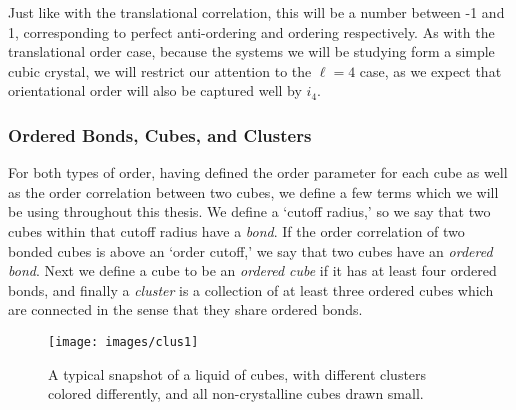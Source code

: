 \documentclass[thesis]{subfiles}
\begin{document}
Just like with the translational correlation, this will be a number between -1 and 1, corresponding to perfect anti-ordering and ordering respectively. As with the translational order case, because the systems we will be studying form a simple cubic crystal, we will restrict our attention to the $\ell = 4$ case, as we expect that orientational order will also be captured well by $i_4$.

\subsubsection{Ordered Bonds, Cubes, and Clusters}

For both types of order, having defined the order parameter for each cube as well as the order correlation between two cubes, we define a few terms which we will be using throughout this thesis.
We define a `cutoff radius,' so we say that two cubes within that cutoff radius have a \emph{bond}. If the order correlation of two bonded cubes is above an `order cutoff,' we say that two cubes have an \emph{ordered bond}. Next we define a cube to be an \emph{ordered cube} if it has at least four ordered bonds, and finally a \emph{cluster} is a collection of at least three ordered cubes which are connected in the sense that they share ordered bonds.\\


\begin{wrapfigure}{r}{0.5\textwidth}
	\vspace{-20pt}
	\centering
	\texttt{[image: images/clus1]}
	\vspace{-20pt}
	\caption{A typical snapshot of a liquid of cubes, with different clusters colored differently, and all non-crystalline cubes drawn small.} \label{fig:ex.}
	\vspace{-15pt}
\end{wrapfigure}
\end{document}
